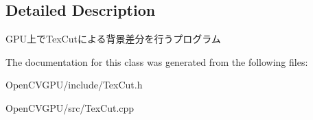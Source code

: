 \subsection{Detailed Description}
G\+P\+U上で\+Tex\+Cutによる背景差分を行うプログラム 

The documentation for this class was generated from the following files\+:\begin{DoxyCompactItemize}
\item 
Open\+C\+V\+G\+P\+U/include/Tex\+Cut.\+h\item 
Open\+C\+V\+G\+P\+U/src/Tex\+Cut.\+cpp\end{DoxyCompactItemize}
